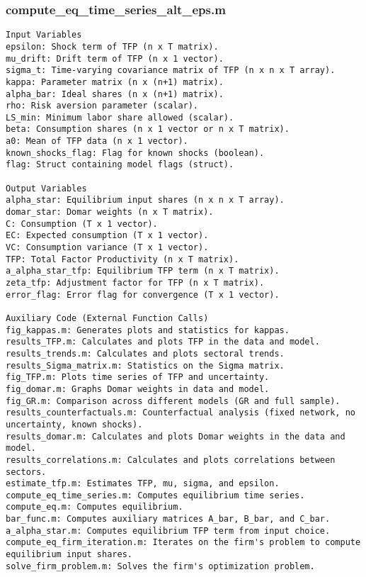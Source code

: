 \documentclass[11pt]{article}
\theoremstyle{definition}
\newcommand{\codepath}{F:/12004835/replication_package_final/replication_package_final}
\begin{document}
	
	
	\subsubsection{compute\_eq\_time\_series\_alt\_eps.m}
	\begin{lstlisting}[style=Matlab]
Input Variables
epsilon: Shock term of TFP (n x T matrix).
mu_drift: Drift term of TFP (n x 1 vector).
sigma_t: Time-varying covariance matrix of TFP (n x n x T array).
kappa: Parameter matrix (n x (n+1) matrix).
alpha_bar: Ideal shares (n x (n+1) matrix).
rho: Risk aversion parameter (scalar).
LS_min: Minimum labor share allowed (scalar).
beta: Consumption shares (n x 1 vector or n x T matrix).
a0: Mean of TFP data (n x 1 vector).
known_shocks_flag: Flag for known shocks (boolean).
flag: Struct containing model flags (struct).

Output Variables
alpha_star: Equilibrium input shares (n x n x T array).
domar_star: Domar weights (n x T matrix).
C: Consumption (T x 1 vector).
EC: Expected consumption (T x 1 vector).
VC: Consumption variance (T x 1 vector).
TFP: Total Factor Productivity (n x T matrix).
a_alpha_star_tfp: Equilibrium TFP term (n x T matrix).
zeta_tfp: Adjustment factor for TFP (n x T matrix).
error_flag: Error flag for convergence (T x 1 vector).

Auxiliary Code (External Function Calls)
fig_kappas.m: Generates plots and statistics for kappas.
results_TFP.m: Calculates and plots TFP in the data and model.
results_trends.m: Calculates and plots sectoral trends.
results_Sigma_matrix.m: Statistics on the Sigma matrix.
fig_TFP.m: Plots time series of TFP and uncertainty.
fig_domar.m: Graphs Domar weights in data and model.
fig_GR.m: Comparison across different models (GR and full sample).
results_counterfactuals.m: Counterfactual analysis (fixed network, no uncertainty, known shocks).
results_domar.m: Calculates and plots Domar weights in the data and model.
results_correlations.m: Calculates and plots correlations between sectors.
estimate_tfp.m: Estimates TFP, mu, sigma, and epsilon.
compute_eq_time_series.m: Computes equilibrium time series.
compute_eq.m: Computes equilibrium.
bar_func.m: Computes auxiliary matrices A_bar, B_bar, and C_bar.
a_alpha_star.m: Computes equilibrium TFP term from input choice.
compute_eq_firm_iteration.m: Iterates on the firm's problem to compute equilibrium input shares.
solve_firm_problem.m: Solves the firm's optimization problem.
	\end{lstlisting}
	
	
\end{document}

